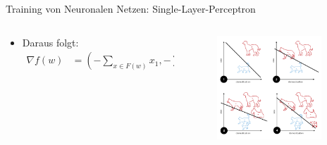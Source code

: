 \documentclass[aspectratio=1610, xcolor=dvipsnames, 9pt]{beamer}
\begin{document}
      \begin{frame}{Training von Neuronalen Netzen: Single-Layer-Perceptron}
        \begin{columns}
          \begin{column}{0.7\textwidth}
            \begin{itemize}

              \item Daraus folgt: \begin{align} 
                                  \nabla f(w) &= \left(  -\sum_{x \in F(w)} x_1,  -\sum_{x \in F(w)} x_2, ... ,  -\sum_{x \in F(w)} x_n   \right)
                                              &= -\sum_{x \in F(w)} x
                                  \end{align}
            \end{itemize}
          \end{column}
          \begin{column}{0.3\textwidth}
       \begin{figure}
       \centering
                   \includegraphics[width=0.9\textwidth]{images/Perceptron_example.svg.png}
       \end{figure}
          \end{column}
        \end{columns}
      \end{frame}
\end{document}
